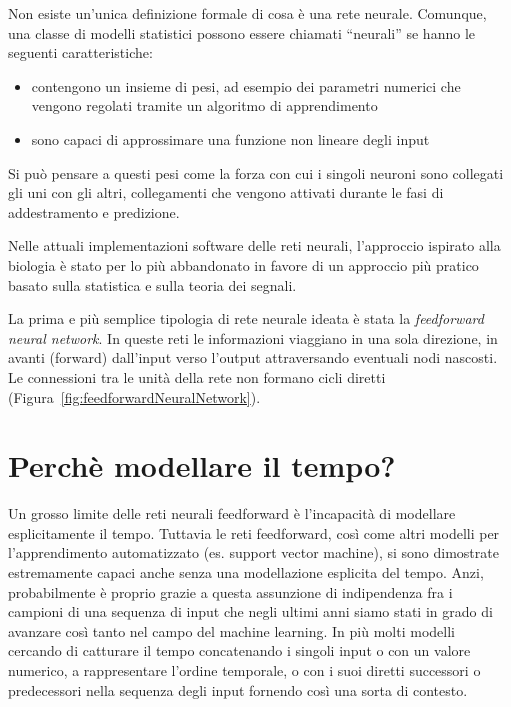 Non esiste un'unica definizione formale di cosa \`e una rete neurale.
Comunque, una classe di modelli statistici possono essere chiamati ``neurali'' se
hanno le seguenti caratteristiche:

\begin{itemize}
  \item contengono un insieme di pesi, ad esempio dei parametri numerici che
        vengono regolati tramite un algoritmo di apprendimento
  \item sono capaci di approssimare una funzione non lineare degli input
\end{itemize}

Si pu\`o pensare a questi pesi come la forza con cui i singoli neuroni sono
collegati gli uni con gli altri, collegamenti che vengono attivati durante le
fasi di addestramento e predizione.

Nelle attuali implementazioni software delle reti neurali, l'approccio ispirato
alla biologia \`e stato per lo pi\`u abbandonato in favore di un approccio pi\`u
pratico basato sulla statistica e sulla teoria dei segnali.

La prima e pi\`u semplice tipologia di rete neurale ideata \`e stata la
\emph{feedforward neural network}. In queste reti le informazioni viaggiano in
una sola direzione, in avanti (forward) dall'input verso l'output attraversando
eventuali nodi nascosti. Le connessioni tra le unit\`a della rete non formano
cicli diretti (Figura~\ref{fig:feedforwardNeuralNetwork}).

\section{Perch\`e modellare il tempo?}

Un grosso limite delle reti neurali feedforward \`e l'incapacit\`a di modellare
esplicitamente il tempo. Tuttavia le reti feedforward, cos\`i come altri modelli
per l'apprendimento automatizzato (es. support vector machine), si sono dimostrate
estremamente capaci anche senza una modellazione esplicita del tempo. Anzi,
probabilmente \`e proprio grazie a questa assunzione di indipendenza fra i campioni
di una sequenza di input che negli ultimi anni siamo stati in grado di avanzare
cos\`i tanto nel campo del machine learning. In pi\`u molti modelli cercando di
catturare il tempo concatenando i singoli input o con un valore numerico, a
rappresentare l'ordine temporale, o con i suoi diretti successori o predecessori
nella sequenza degli input fornendo cos\`i una sorta di contesto.

